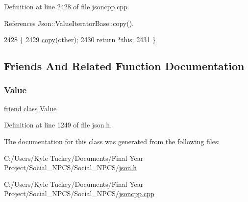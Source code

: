 Definition at line 2428 of file jsoncpp.\+cpp.



References Json\+::\+Value\+Iterator\+Base\+::copy().


\begin{DoxyCode}
2428                                                              \{
2429   \hyperlink{class_json_1_1_value_iterator_base_a496e6aba44808433ec5858c178be5719}{copy}(other);
2430   \textcolor{keywordflow}{return} *\textcolor{keyword}{this};
2431 \}
\end{DoxyCode}


\subsection{Friends And Related Function Documentation}
\mbox{\label{class_json_1_1_value_iterator_aeceedf6e1a7d48a588516ce2b1983d6f}} 
\subsubsection{\texorpdfstring{Value}{Value}}
{\footnotesize\ttfamily friend class \hyperlink{class_json_1_1_value}{Value}\hspace{0.3cm}{\ttfamily [friend]}}



Definition at line 1249 of file json.\+h.



The documentation for this class was generated from the following files\+:\begin{DoxyCompactItemize}
\item 
C\+:/\+Users/\+Kyle Tuckey/\+Documents/\+Final Year Project/\+Social\+\_\+\+N\+P\+C\+S/\+Social\+\_\+\+N\+P\+C\+S/\hyperlink{json_8h}{json.\+h}\item 
C\+:/\+Users/\+Kyle Tuckey/\+Documents/\+Final Year Project/\+Social\+\_\+\+N\+P\+C\+S/\+Social\+\_\+\+N\+P\+C\+S/\hyperlink{jsoncpp_8cpp}{jsoncpp.\+cpp}\end{DoxyCompactItemize}
